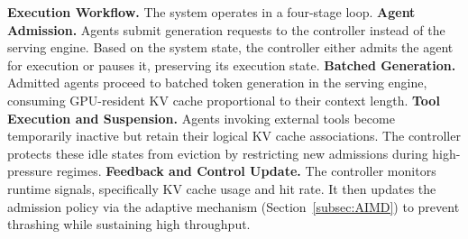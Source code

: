 \noindent\textbf{Execution Workflow.} The system operates in a four-stage loop. 
 \textbf{Agent Admission.} 
Agents submit generation requests to the controller instead of the serving engine. Based on the system state, the controller either admits the agent for execution or pauses it, preserving its execution state.
 \textbf{Batched Generation.} 
Admitted agents proceed to batched token generation in the serving engine, consuming GPU-resident KV cache proportional to their context length.
 \textbf{Tool Execution and Suspension.} 
Agents invoking external tools become temporarily inactive but retain their logical KV cache associations. The controller protects these idle states from eviction by restricting new admissions during high-pressure regimes.
 \textbf{Feedback and Control Update.} 
The controller monitors runtime signals, specifically KV cache usage and hit rate. It then updates the admission policy via the adaptive mechanism (Section~\ref{subsec:AIMD}) to prevent thrashing while sustaining high throughput.

